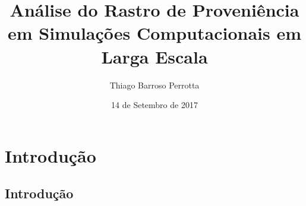 \documentclass[12pt,compress]{beamer}
\title[Análise do Rastro de Proveniência]{Análise do Rastro de Proveniência em Simulações Computacionais em Larga Escala} %
\author[Thiago B. Perrotta]{Thiago Barroso Perrotta} %
\institute[UFRJ] %
{
Engenharia de Computação e Informação \\ \smallskip
Escola Politécnica --- Universidade Federal do Rio de Janeiro \\ %
\medskip
\href{mailto:perrotta.thiago@poli.ufrj.br}{\nolinkurl{perrotta.thiago@poli.ufrj.br}} %
}
\date{14 de Setembro de 2017} %
\makeatletter
\newenvironment{withoutheadline}{
        \setbeamertemplate{headline}[default]
        \def\beamer@entrycode{\vspace*{-\headheight}}
    }{}
\makeatother
\begin{document}
{
\begin{frame}
  \titlepage{}
\end{frame}
\addtocounter{page}{-1}
}




\section{Introdução}
\subsection*{Introdução}
\end{document}
